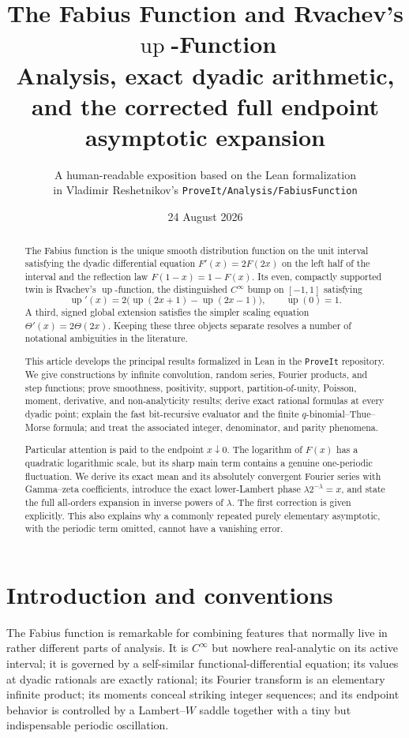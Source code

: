 \documentclass[11pt]{article}
\title{\bfseries The Fabius Function and Rvachev's \texorpdfstring{$\operatorname{up}$}{up}-Function\\[4pt]
\large Analysis, exact dyadic arithmetic, and the corrected full endpoint asymptotic expansion}
\author{A human-readable exposition based on the Lean formalization\\
\normalsize in Vladimir Reshetnikov's \texttt{ProveIt/Analysis/FabiusFunction}}
\date{24 August 2026}
\numberwithin{equation}{section}
\theoremstyle{definition}
\theoremstyle{remark}
\newcommand{\upf}{\operatorname{up}}
\newcommand{\Th}{\Theta}
\begin{document}
\maketitle

\begin{abstract}
The Fabius function is the unique smooth distribution function on the unit
interval satisfying the dyadic differential equation $F'(x)=2F(2x)$ on the
left half of the interval and the reflection law $F(1-x)=1-F(x)$.  Its even,
compactly supported twin is Rvachev's $\upf$-function, the distinguished
$C^\infty$ bump on $[-1,1]$ satisfying
\[
 \upf'(x)=2\bigl(\upf(2x+1)-\upf(2x-1)\bigr),
 \qquad \upf(0)=1.
\]
A third, signed global extension satisfies the simpler scaling equation
$\Th'(x)=2\Th(2x)$.  Keeping these three objects separate resolves a number
of notational ambiguities in the literature.

This article develops the principal results formalized in Lean in the
\texttt{ProveIt} repository.  We give constructions by infinite convolution,
random series, Fourier products, and step functions; prove smoothness,
positivity, support, partition-of-unity, Poisson, moment, derivative, and
non-analyticity results; derive exact rational formulas at every dyadic point;
explain the fast bit-recursive evaluator and the finite
$q$-binomial--Thue--Morse formula; and treat the associated integer,
denominator, and parity phenomena.

Particular attention is paid to the endpoint $x\downarrow0$.  The logarithm
of $F(x)$ has a quadratic logarithmic scale, but its sharp main term contains
a genuine one-periodic fluctuation.  We derive its exact mean and its
absolutely convergent Fourier series with Gamma--zeta coefficients, introduce
the exact lower-Lambert phase $\lambda2^{-\lambda}=x$, and state the full
all-orders expansion in inverse powers of $\lambda$.  The first correction is
given explicitly.  This also explains why a commonly repeated purely
elementary asymptotic, with the periodic term omitted, cannot have a vanishing
error.
\end{abstract}

\tableofcontents
\newpage

\section{Introduction and conventions}

The Fabius function is remarkable for combining features that normally live
in rather different parts of analysis.  It is $C^\infty$ but nowhere
real-analytic on its active interval; it is governed by a self-similar
functional-differential equation; its values at dyadic rationals are exactly
rational; its Fourier transform is an elementary infinite product; its
moments conceal striking integer sequences; and its endpoint behavior is
controlled by a Lambert--$W$ saddle together with a tiny but indispensable
periodic oscillation.
\end{document}
